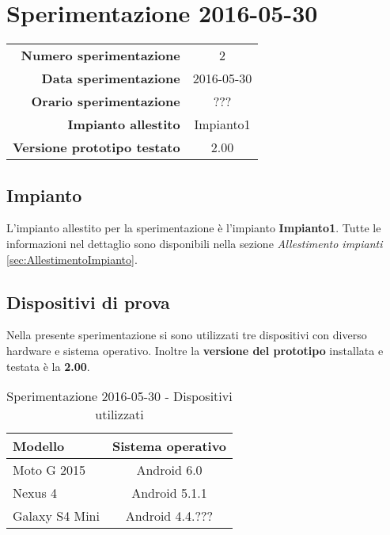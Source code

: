 \documentclass[../Sperimentazione.tex]{subfiles}
\begin{document}
	\section{Sperimentazione 2016-05-30}
	
		\begin{table} [h]
		\centering
		\begin{tabular}[width=0.5\textwidth]{r|c}
			\textbf{Numero sperimentazione} & 2 \\
			\textbf{Data sperimentazione} & 2016-05-30 \\
			\textbf{Orario sperimentazione} & ??? \\
			\textbf{Impianto allestito} & Impianto1 \\
			\textbf{Versione prototipo testato} & 2.00 \\		
		\end{tabular}
		\end{table}
		
		
		\subsection{Impianto}
		L'impianto allestito per la sperimentazione è l'impianto \textbf{Impianto1}. Tutte le informazioni nel dettaglio sono disponibili nella sezione \textit{Allestimento impianti} \ref{sec:AllestimentoImpianto}.


		\subsection{Dispositivi di prova}
			Nella presente sperimentazione si sono utilizzati tre dispositivi con diverso hardware e sistema operativo. Inoltre la \textbf{versione del prototipo} installata e testata è la \textbf{2.00}.
	
			\begin{table} [h]
			\centering
				\begin{tabular}{lc}
					\textbf{Modello} & \textbf{Sistema operativo} \\
					\toprule
					 Moto G 2015 & Android 6.0 \\
					 \midrule
					 Nexus 4 & Android 5.1.1 \\
					 \midrule
					 Galaxy S4 Mini & Android 4.4.??? \\
					\bottomrule
				\end{tabular}
				\caption{Sperimentazione 2016-05-30 - Dispositivi utilizzati}
				\label{tab:Sperimentazione1Dispositivi}
			\end{table}
		
\end{document}
